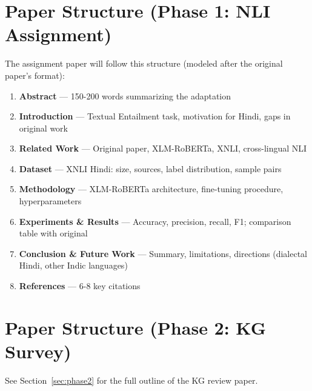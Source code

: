 \section{Paper Structure (Phase 1: NLI Assignment)}

The assignment paper will follow this structure (modeled after the original paper's format):

\begin{enumerate}[nosep]
    \item \textbf{Abstract} --- 150-200 words summarizing the adaptation
    \item \textbf{Introduction} --- Textual Entailment task, motivation for Hindi, gaps in original work
    \item \textbf{Related Work} --- Original paper, XLM-RoBERTa, XNLI, cross-lingual NLI
    \item \textbf{Dataset} --- XNLI Hindi: size, sources, label distribution, sample pairs
    \item \textbf{Methodology} --- XLM-RoBERTa architecture, fine-tuning procedure, hyperparameters
    \item \textbf{Experiments \& Results} --- Accuracy, precision, recall, F1; comparison table with original
    \item \textbf{Conclusion \& Future Work} --- Summary, limitations, directions (dialectal Hindi, other Indic languages)
    \item \textbf{References} --- 6-8 key citations
\end{enumerate}

\section{Paper Structure (Phase 2: KG Survey)}

See Section~\ref{sec:phase2} for the full outline of the KG review paper.
